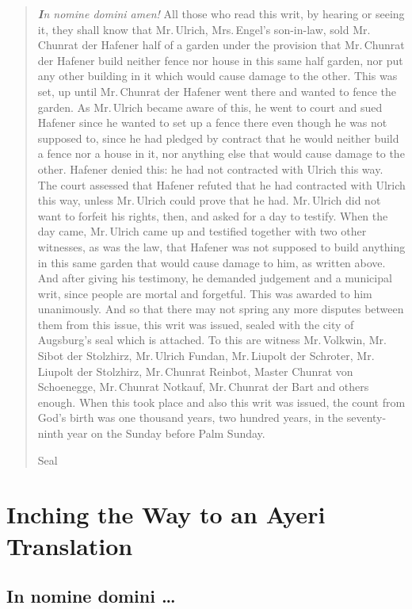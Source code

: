 \documentclass[12pt,paper=a4]{scrartcl}
\begin{document}
\blockquote{\emph{\textbf{I}n nomine domini amen!} All those who read this writ, 
by hearing or seeing it, they shall know that Mr.\,Ulrich, Mrs.\,Engel's 
son-in-law, sold Mr.\,Chunrat der Hafener half of a garden under the provision 
that Mr.\,Chunrat der Hafener build neither fence nor house in this same half 
garden, nor put any other building in it which would cause damage to the other. 
This was set, up until Mr.\,Chunrat der Hafener went there and wanted to fence the 
garden. As Mr.\,Ulrich became aware of this, he went to court and sued Hafener 
since he wanted to set up a fence there even though he was not supposed to, 
since he had pledged by contract that he would neither build a fence nor a house 
in it, nor anything else that would cause damage to the other. Hafener denied 
this: he had not contracted with Ulrich this way. The court assessed that 
Hafener refuted that he had contracted with Ulrich this way, unless Mr.\,Ulrich 
could prove that he had. Mr.\,Ulrich did not want to forfeit his rights, then, 
and asked for a day to testify. When the day came, Mr.\,Ulrich came up and 
testified together with two other witnesses, as was the law, that Hafener was 
not supposed to build anything in this same garden that would cause damage to 
him, as written above. And after giving his testimony, he demanded judgement and 
a municipal writ, since people are mortal and forgetful. This was awarded to him 
unanimously. And so that there may not spring any more disputes between them 
from this issue, this writ was issued, sealed with the city of Augsburg's seal 
which is attached. To this are witness Mr.\,Volkwin, Mr.\,Sibot der Stolzhirz, 
Mr.\,Ulrich Fundan, Mr.\,Liupolt der Schroter, Mr.\,Liupolt der Stolzhirz, 
Mr.\,Chunrat Reinbot, Master Chunrat von Schoenegge, Mr.\,Chunrat Notkauf, 
Mr.\,Chunrat der Bart and others enough. When this took place and also this 
writ was issued, the count from God's birth was one thousand years, two hundred 
years, in the seventy-ninth year on the Sunday before Palm Sunday.

\begin{center}
Seal
\end{center}}

\section{Inching the Way to an Ayeri Translation}

\subsection*{In nomine domini …}
\end{document}
